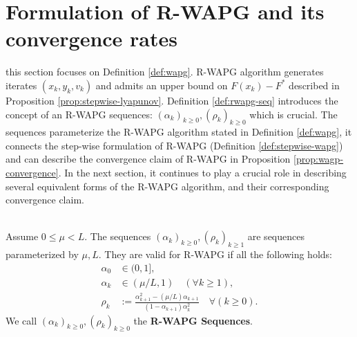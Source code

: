 \documentclass[12pt]{article}
\begin{document}
\section{Formulation of R-WAPG and its convergence rates}\label{sec:rwapg-formulation-convergence}
    this section focuses on Definition \ref{def:wapg}.
    R-WAPG algorithm generates iterates $(x_k, y_k, v_k)$ and admits an upper bound on $F(x_k) - F^*$ described in Proposition \ref{prop:stepwise-lyapunov}. 
    Definition \ref{def:rwapg-seq} introduces the concept of an R-WAPG sequences: $(\alpha_k)_{k \ge 0}, (\rho_k)_{k \ge 0}$ which is crucial.
    The sequences parameterize the R-WAPG algorithm stated in Definition \ref{def:wapg}, it connects the step-wise formulation of R-WAPG (Definition \ref{def:stepwise-wapg}) and can describe the convergence claim of R-WAPG in Proposition \ref{prop:wagp-convergence}. 
    In the next section, it continues to play a crucial role in describing several equivalent forms of the R-WAPG algorithm, and their corresponding convergence claim. 
    \begin{definition}\label{def:rwapg-seq}\;\\
        Assume $0 \le \mu < L$. 
        The sequences $(\alpha_k)_{k \ge 0}, (\rho_k)_{k \ge1}$ are sequences parameterized by $\mu, L$. 
        They are valid for R-WAPG if all the following holds: 
        \begin{align*}
            \alpha_0 &\in (0, 1], 
            \\
            \alpha_k &\in (\mu/L, 1) \quad (\forall k \ge 1), 
            \\
            \rho_k &:= \frac{\alpha_{k + 1}^2 - (\mu/L)\alpha_{k + 1}}{(1 - \alpha_{k + 1})\alpha_k^2} \quad \forall (k \ge 0). 
        \end{align*}
        We call $(\alpha_k)_{k \ge 0}, (\rho_k)_{k \ge 0}$ the \textbf{R-WAPG Sequences}. 
    \end{definition}
\end{document}
